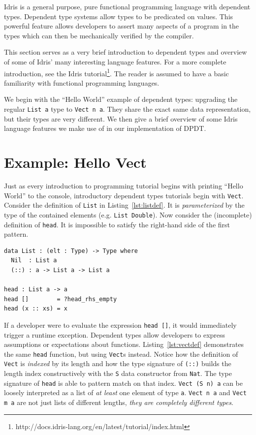 \documentclass[12pt]{report}
\begin{document}
Idris is a general purpose, pure functional programming language with dependent types.
Dependent type systems allow types to be predicated on values.
This powerful feature allows developers to assert many aspects of a program in the types which can then be mechanically verified by the compiler.

This section serves as a very brief introduction to dependent types and overview of some of Idris' many interesting language features.
For a more complete introduction, see the Idris tutorial\footnote{http://docs.idris-lang.org/en/latest/tutorial/index.html}.
The reader is assumed to have a basic familiarity with functional programming languages.

We begin with the ``Hello World'' example of dependent types: upgrading the regular \texttt{List a} type to \texttt{Vect n a}.
They share the exact same data representation, but their types are very different.
We then give a brief overview of some Idris language features we make use of in our implementation of DPDT.

\section{Example: Hello Vect}

Just as every introduction to programming tutorial begins with printing ``Hello World'' to the console, introductory dependent types tutorials begin with \texttt{Vect}.
Consider the definition of \texttt{List} in Listing~\ref{lst:listdef}.
It is \textit{parameterized} by the type of the contained elements (e.g. \texttt{List Double}).
Now consider the (incomplete) definition of \texttt{head}.
It is impossible to satisfy the right-hand side of the first pattern.

\begin{lstlisting}[float,caption={List Definition},label={lst:listdef}]
data List : (elt : Type) -> Type where
  Nil  : List a
  (::) : a -> List a -> List a

head : List a -> a
head []        = ?head_rhs_empty
head (x :: xs) = x
\end{lstlisting}

If a developer were to evaluate the expression \texttt{head []}, it would immediately trigger a runtime exception.
Dependent types allow developers to express assumptions or expectations about functions.
Listing~\ref{lst:vectdef} demonstrates the same \texttt{head} function, but using \texttt{Vect}s instead.
Notice how the definition of \texttt{Vect} is \textit{indexed} by its length and how the type signature of \texttt{(::)} builds the length index constructively with the \texttt{S} data constructor from \texttt{Nat}.
The type signature of \texttt{head} is able to pattern match on that index.
\texttt{Vect (S n) a} can be loosely interpreted as a list of \textit{at least} one element of type \texttt{a}.
\texttt{Vect n a} and \texttt{Vect m a} are not just lists of different lengths, \textit{they are completely different types}.
\end{document}
